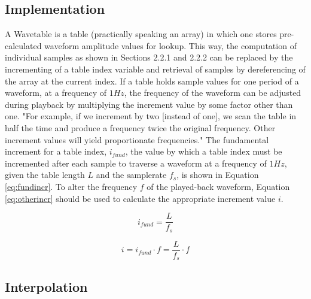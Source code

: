   \subsection{Implementation}

  A Wavetable is a table (practically speaking an array) in which one stores pre-calculated waveform amplitude values for lookup. This way, the computation of individual samples as shown in Sections 2.2.1 and 2.2.2 can be replaced by the incrementing of a table index variable and retrieval of samples by dereferencing of the array at the current index. If a table holds sample values for one period of a waveform, at a frequency of $1 Hz$, the frequency of the waveform can be adjusted during playback by multiplying the increment value by some factor other than one. "For example, if we increment by two [instead of one], we scan the table in half the time and produce a frequency twice the original frequency. Other increment values will yield proportionate frequencies."  The fundamental increment for a table index, $i_{fund}$, the value by which a table index must be incremented after each sample to traverse a waveform at a frequency of $1 Hz$, given the table length $L$ and the samplerate $f_{s}$, is shown in Equation \ref{eq:fundincr}. To alter the frequency $f$ of the played-back waveform, Equation \ref{eq:otherincr} should be used to calculate the appropriate increment value $i$.

  \begin{equation}
    i_{fund} = \frac{L}{f_{s}}
    \label{eq:fundincr}
  \end{equation}

  \begin{equation}
    i = i_{fund} \cdot f = \frac{L}{f_{s}} \cdot f
    \label{eq:otherincr}
  \end{equation}

  \subsection{Interpolation}


